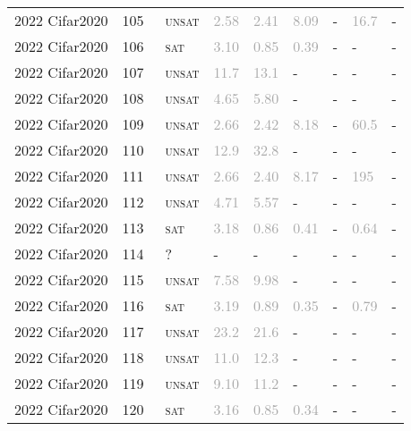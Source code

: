 \begin{center}
{\begin{longtable}{@{}lllllllll@{}}
2022 Cifar2020 & 105 & ~\textsc{unsat} & \textcolor{darkgray}{2.58} & \textcolor{darkgray}{2.41} & \textcolor{darkgray}{8.09} & - & \textcolor{darkgray}{16.7} & - \\
2022 Cifar2020 & 106 & ~\textsc{sat} & \textcolor{darkgray}{3.10} & \textcolor{darkgray}{0.85} & \textcolor{darkgray}{0.39} & - & - & - \\
2022 Cifar2020 & 107 & ~\textsc{unsat} & \textcolor{darkgray}{11.7} & \textcolor{darkgray}{13.1} & - & - & - & - \\
2022 Cifar2020 & 108 & ~\textsc{unsat} & \textcolor{darkgray}{4.65} & \textcolor{darkgray}{5.80} & - & - & - & - \\
2022 Cifar2020 & 109 & ~\textsc{unsat} & \textcolor{darkgray}{2.66} & \textcolor{darkgray}{2.42} & \textcolor{darkgray}{8.18} & - & \textcolor{darkgray}{60.5} & - \\
2022 Cifar2020 & 110 & ~\textsc{unsat} & \textcolor{darkgray}{12.9} & \textcolor{darkgray}{32.8} & - & - & - & - \\
2022 Cifar2020 & 111 & ~\textsc{unsat} & \textcolor{darkgray}{2.66} & \textcolor{darkgray}{2.40} & \textcolor{darkgray}{8.17} & - & \textcolor{darkgray}{195} & - \\
2022 Cifar2020 & 112 & ~\textsc{unsat} & \textcolor{darkgray}{4.71} & \textcolor{darkgray}{5.57} & - & - & - & - \\
2022 Cifar2020 & 113 & ~\textsc{sat} & \textcolor{darkgray}{3.18} & \textcolor{darkgray}{0.86} & \textcolor{darkgray}{0.41} & - & \textcolor{darkgray}{0.64} & - \\
2022 Cifar2020 & 114 & ~? & - & - & - & - & - & - \\
2022 Cifar2020 & 115 & ~\textsc{unsat} & \textcolor{darkgray}{7.58} & \textcolor{darkgray}{9.98} & - & - & - & - \\
2022 Cifar2020 & 116 & ~\textsc{sat} & \textcolor{darkgray}{3.19} & \textcolor{darkgray}{0.89} & \textcolor{darkgray}{0.35} & - & \textcolor{darkgray}{0.79} & - \\
2022 Cifar2020 & 117 & ~\textsc{unsat} & \textcolor{darkgray}{23.2} & \textcolor{darkgray}{21.6} & - & - & - & - \\
2022 Cifar2020 & 118 & ~\textsc{unsat} & \textcolor{darkgray}{11.0} & \textcolor{darkgray}{12.3} & - & - & - & - \\
2022 Cifar2020 & 119 & ~\textsc{unsat} & \textcolor{darkgray}{9.10} & \textcolor{darkgray}{11.2} & - & - & - & - \\
2022 Cifar2020 & 120 & ~\textsc{sat} & \textcolor{darkgray}{3.16} & \textcolor{darkgray}{0.85} & \textcolor{darkgray}{0.34} & - & - & - \\

\end{longtable}}
\end{center}
